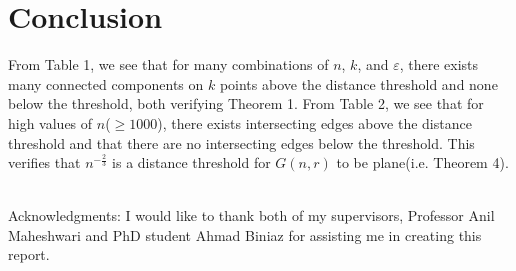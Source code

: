 \documentclass{article}
\newcommand{\dg}{G(n,r)}
\begin{document}
\section{Conclusion}
From Table 1, we see that for many combinations of $n$, $k$, and $\varepsilon$, there exists many connected components on $k$ points above the distance threshold
and none below the threshold, both verifying Theorem 1. From Table 2, we see that for high values of $n$($\geq 1000$), there exists intersecting edges above the distance threshold and that there are no intersecting edges below the threshold. This verifies that $n^{-\frac{2}{3}}$ is a distance threshold for $\dg$ to be plane(i.e. Theorem 4).
\\
\\
\begin{small}Acknowledgments: I would like to thank both of my supervisors, Professor Anil Maheshwari and PhD student Ahmad Biniaz for assisting me in creating this report.\end{small}



\end{document}
